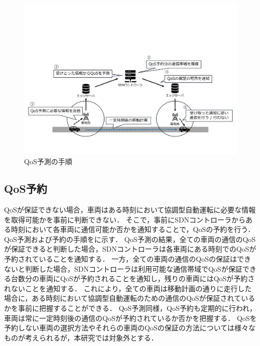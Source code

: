 \documentclass[a4paper,10pt,twocolumn,uplatex]{jsarticle}
\begin{document}
\begin{figure}[t]
	\begin{centering}
    \includegraphics[width=\linewidth]{img/2023_11_手順（低め）.pdf}
    \caption{QoS予測の手順}
    \label{fig:QoSprediction}
    \end{centering}
\end{figure}

\subsection{QoS予約}
QoSが保証できない場合，車両はある時刻において協調型自動運転に必要な情報を取得可能かを事前に判断できない．
そこで，事前にSDNコントローラからある時刻において各車両に通信可能か否かを通知することで，QoSの予約を行う．
QoS予測および予約の手順をに示す．
QoS予測の結果，全ての車両の通信のQoSが保証できると判断した場合，SDNコントローラは各車両にある時刻でのQoSが予約されていることを通知する．
一方，全ての車両の通信のQoSの保証はできないと判断した場合，SDNコントローラは利用可能な通信帯域でQoSが保証できる台数分の車両にQoSが予約されることを通知し，残りの車両にはQoSが予約されないことを通知する．
これにより，全ての車両は移動計画の通りに走行した場合に，ある時刻において協調型自動運転のための通信のQoSが保証されているかを事前に把握することができる．
QoS予測同様，QoS予約も定期的に行われ，車両は常に一定時刻後の通信のQoSが予約されているか否かを把握する．
QoSを予約しない車両の選択方法やそれらの車両のQoSの保証の方法については様々なものが考えられるが，本研究では対象外とする．

\end{document}
